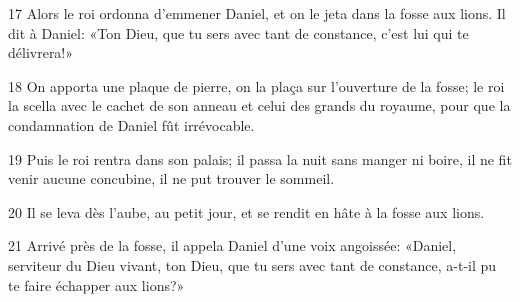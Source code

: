 
17 Alors le roi ordonna d’emmener Daniel, et on le jeta dans la fosse aux lions. Il dit à Daniel: «Ton Dieu, que tu sers avec tant de constance, c’est lui qui te délivrera!»

18 On apporta une plaque de pierre, on la plaça sur l’ouverture de la fosse; le roi la scella avec le cachet de son anneau et celui des grands du royaume, pour que la condamnation de Daniel fût irrévocable.

19 Puis le roi rentra dans son palais; il passa la nuit sans manger ni boire, il ne fit venir aucune concubine, il ne put trouver le sommeil.

20 Il se leva dès l’aube, au petit jour, et se rendit en hâte à la fosse aux lions.

21 Arrivé près de la fosse, il appela Daniel d’une voix angoissée: «Daniel, serviteur du Dieu vivant, ton Dieu, que tu sers avec tant de constance, a-t-il pu te faire échapper aux lions?»
